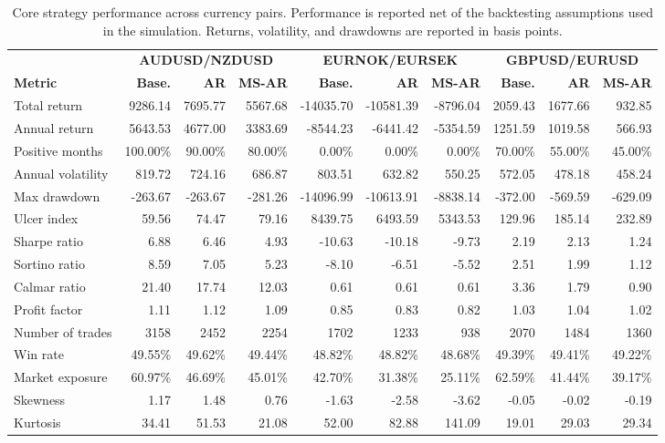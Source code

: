 \begin{table}[H]
\centering
\caption{Core strategy performance across currency pairs. Performance is reported net of the backtesting assumptions used in the simulation. Returns, volatility, and drawdowns are reported in basis points.}
\label{tab:strategy_performance_all_pairs}
\scriptsize
\setlength{\tabcolsep}{3pt}
\begin{adjustbox}{max width=\linewidth}
\begin{tabular}{lrrrrrrrrr}
\toprule
& \multicolumn{3}{c}{\textbf{AUDUSD/NZDUSD}}
& \multicolumn{3}{c}{\textbf{EURNOK/EURSEK}}
& \multicolumn{3}{c}{\textbf{GBPUSD/EURUSD}} \\
\cmidrule(lr){2-4}
\cmidrule(lr){5-7}
\cmidrule(lr){8-10}
\textbf{Metric}
& \textbf{Base.} & \textbf{AR} & \textbf{MS-AR}
& \textbf{Base.} & \textbf{AR} & \textbf{MS-AR}
& \textbf{Base.} & \textbf{AR} & \textbf{MS-AR} \\
\midrule
Total return & 9286.14 & 7695.77 & 5567.68 & -14035.70 & -10581.39 & -8796.04 & 2059.43 & 1677.66 & 932.85 \\
Annual return & 5643.53 & 4677.00 & 3383.69 & -8544.23 & -6441.42 & -5354.59 & 1251.59 & 1019.58 & 566.93 \\
Positive months & 100.00\% & 90.00\% & 80.00\% & 0.00\% & 0.00\% & 0.00\% & 70.00\% & 55.00\% & 45.00\% \\
Annual volatility & 819.72 & 724.16 & 686.87 & 803.51 & 632.82 & 550.25 & 572.05 & 478.18 & 458.24 \\
Max drawdown & -263.67 & -263.67 & -281.26 & -14096.99 & -10613.91 & -8838.14 & -372.00 & -569.59 & -629.09 \\
Ulcer index & 59.56 & 74.47 & 79.16 & 8439.75 & 6493.59 & 5343.53 & 129.96 & 185.14 & 232.89 \\
Sharpe ratio & 6.88 & 6.46 & 4.93 & -10.63 & -10.18 & -9.73 & 2.19 & 2.13 & 1.24 \\
Sortino ratio & 8.59 & 7.05 & 5.23 & -8.10 & -6.51 & -5.52 & 2.51 & 1.99 & 1.12 \\
Calmar ratio & 21.40 & 17.74 & 12.03 & 0.61 & 0.61 & 0.61 & 3.36 & 1.79 & 0.90 \\
Profit factor & 1.11 & 1.12 & 1.09 & 0.85 & 0.83 & 0.82 & 1.03 & 1.04 & 1.02 \\
Number of trades & 3158 & 2452 & 2254 & 1702 & 1233 & 938 & 2070 & 1484 & 1360 \\
Win rate & 49.55\% & 49.62\% & 49.44\% & 48.82\% & 48.82\% & 48.68\% & 49.39\% & 49.41\% & 49.22\% \\
Market exposure & 60.97\% & 46.69\% & 45.01\% & 42.70\% & 31.38\% & 25.11\% & 62.59\% & 41.44\% & 39.17\% \\
Skewness & 1.17 & 1.48 & 0.76 & -1.63 & -2.58 & -3.62 & -0.05 & -0.02 & -0.19 \\
Kurtosis & 34.41 & 51.53 & 21.08 & 52.00 & 82.88 & 141.09 & 19.01 & 29.03 & 29.34 \\
\bottomrule
\end{tabular}
\end{adjustbox}
\end{table}


